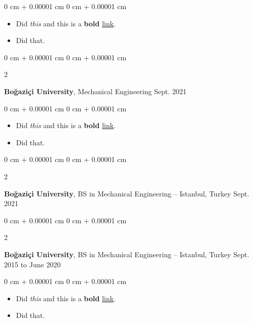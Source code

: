 \documentclass[10pt, letterpaper]{article}
\newenvironment{highlights}{
    \begin{itemize}[
        topsep=0.10 cm,
        parsep=0.10 cm,
        partopsep=0pt,
        itemsep=0pt,
        leftmargin=0 cm + 10pt
    ]
}{
    \end{itemize}
} %
\newenvironment{onecolentry}{
    \begin{adjustwidth}{
        0 cm + 0.00001 cm
    }{
        0 cm + 0.00001 cm
    }
}{
    \end{adjustwidth}
} %
\newenvironment{twocolentry}[2][]{
    \onecolentry
    \def\secondColumn{#2}
    \setcolumnwidth{\fill, 4.5 cm}
    \begin{paracol}{2}
}{
    \switchcolumn \raggedleft \secondColumn
    \end{paracol}
    \endonecolentry
} %
\begin{document}
        \vspace{0.10 cm}
        \begin{onecolentry}
            \begin{highlights}
                \item Did \textit{this} and this is a \textbf{bold} \href{https://example.com}{link}.
                \item Did that.
            \end{highlights}
        \end{onecolentry}


        \vspace{0.2 cm}

        \begin{twocolentry}{
            Sept. 2021
        }
            \textbf{Boğaziçi University}, Mechanical Engineering\end{twocolentry}

        \vspace{0.10 cm}
        \begin{onecolentry}
            \begin{highlights}
                \item Did \textit{this} and this is a \textbf{bold} \href{https://example.com}{link}.
                \item Did that.
            \end{highlights}
        \end{onecolentry}


        \vspace{0.2 cm}

        \begin{twocolentry}{
            Sept. 2021
        }
            \textbf{Boğaziçi University}, BS in Mechanical Engineering -- Istanbul, Turkey\end{twocolentry}



        \vspace{0.2 cm}

        \begin{twocolentry}{
            Sept. 2015 to June 2020
        }
            \textbf{Boğaziçi University}, BS in Mechanical Engineering -- Istanbul, Turkey\end{twocolentry}

        \vspace{0.10 cm}
        \begin{onecolentry}
            \begin{highlights}
                \item Did \textit{this} and this is a \textbf{bold} \href{https://example.com}{link}.
                \item Did that.
            \end{highlights}
        \end{onecolentry}
\end{document}
